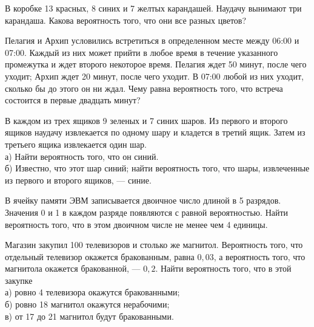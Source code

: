 \newpage\setcounter{zad}{0}



\begin{zkrW}{20}\noindent 
	В коробке 13 красных, 8 синих и 7 желтых карандашей. Наудачу вынимают три карандаша. Какова вероятность того, что они все разных цветов?
 
\end{zkrW}

\begin{zkrW}{20}\noindent 
	Пелагия и Архип условились встретиться в определенном месте между 06:00 и 07:00. Каждый из них может прийти в любое время в течение указанного промежутка и ждет второго некоторое время. Пелагия ждет 50 минут, после чего уходит; Архип ждет 20 минут, после чего уходит. В 07:00 любой из них уходит, сколько бы до этого он ни ждал. Чему равна вероятность того, что встреча состоится в первые двадцать минут?
 
\end{zkrW}

\begin{zkrW}{20}\noindent 
	В каждом из трех ящиков 9 зеленых и 7 синих шаров. Из первого и второго ящиков наудачу извлекается по одному шару и кладется в третий ящик. Затем из третьего ящика извлекается один шар. \\ \indent а) Найти вероятность того, что он синий. \\ \indent б) Известно, что этот шар синий; найти вероятность того, что шары, извлеченные из первого и второго ящиков, --- синие.
 
\end{zkrW}

\begin{zkrW}{20}\noindent 
	В ячейку памяти ЭВМ записывается двоичное число длиной в 5 разрядов. Значения 0 и 1 в каждом разряде появляются с равной вероятностью. Найти вероятность того, что в этом двоичном числе не менее чем 4 единицы.
 
\end{zkrW}

\begin{zkrW}{20}\noindent 
	Магазин закупил 100 телевизоров и столько же магнитол. Вероятность того, что отдельный телевизор окажется бракованным, равна $0{,}03$, а вероятность того, что магнитола окажется бракованной, --- $0{,}2$. Найти вероятность того, что в этой закупке \\ \indent а) ровно 4 телевизора окажутся бракованными; \\ \indent б) ровно 18 магнитол окажутся нерабочими; \\ \indent в) от 17 до 21 магнитол будут бракованными.
 
\end{zkrW}

